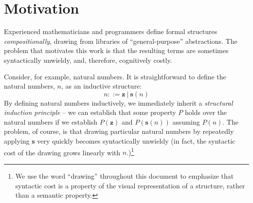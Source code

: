\section{Motivation}\label{sec:intro-motivation}

Experienced mathematicians and programmers define formal structures \emph{compositionally}, drawing from libraries of ``general-purpose'' abstractions. The problem that motivates this work is that the resulting terms are sometimes syntactically unwieldy, and, therefore, cognitively costly. %

Consider, for example, natural numbers. It is straightforward to define the natural numbers, $n$, as an inductive structure:
\[ n ::= \textbf{z} ~\vert~ \textbf{s}(n)\]
By defining natural numbers inductively, we immediately inherit a \emph{structural induction principle} -- we can establish that some property $P$ holds over the natural numbers if we establish $P(\textbf{z})$ and $P(\textbf{s}(n))$ assuming $P(n)$. The problem, of course, is that drawing particular natural numbers by repeatedly applying $\textbf{s}$ very quickly becomes syntactically unwieldy (in fact, the syntactic cost of the drawing grows linearly with $n$.)\footnote{We use the word ``drawing'' throughout this document to emphasize that syntactic cost is a property of the visual representation of a structure, rather than a semantic property.}

